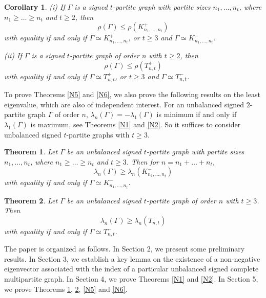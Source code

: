 \documentclass[10pt,a4paper]{amsart}
\numberwithin{equation}{section}
\newtheorem {Theorem} {Theorem}[section]
\newtheorem {Corollary}{Corollary}[section]
\begin{document}
\begin{Corollary}\label{N51}
(i) If  $\Gamma$ is a signed $t$-partite graph with partite sizes $n_1, \dots, n_t$, where $n_1\ge \dots\ge n_t$ and $t\ge 2$, then
\[
\rho(\Gamma)\le \rho (K_{n_1, \dots, n_t}^+)
\]
with equality if and only if $\Gamma\simeq K_{n_1, \dots, n_t}^+$, or $t\ge 3$ and $\Gamma\simeq K_{n_1, \dots, n_t}^-$.

(ii) If $\Gamma$ is a signed $t$-partite graph of order $n$ with $t\ge 2$, then
\[
\rho(\Gamma)\le \rho(T_{n,t}^+)
\]
with equality if and only if $\Gamma\simeq T_{n,t}^+$, or $t\ge 3$ and $\Gamma\simeq
T_{n, t}^-$.
\end{Corollary}








To prove Theorems \ref{N5} and \ref{N6}, we also prove the following results on the least eigenvalue, which are also of independent  interest. 
For an unbalanced signed $2$-partite graph $\Gamma$ of order $n$,  $\lambda_n(\Gamma)=-\lambda_1(\Gamma)$ is minimum if and only if $\lambda_1(\Gamma)$ is maximum, see Theorems \ref{N1} and \ref{N2}. So it suffices to consider unbalanced signed $t$-partite graphs with $t\ge 3$.

 

\begin{Theorem}\label{N3}
Let $\Gamma$ be an unbalanced signed $t$-partite graph with partite sizes $n_1, \dots, n_t$, where $n_1\ge \dots\ge n_t$ and $t\ge 3$. Then for $n=n_1+\dots+n_t$, 
	\[
	\lambda_n(\Gamma)\ge \lambda_n (K_{n_1, \dots, n_t}^-)
	\]
	with equality if and only if $\Gamma\simeq K_{n_1, \dots, n_t}^-$.
\end{Theorem}

\begin{Theorem}\label{N4}
Let $\Gamma$ be an unbalanced signed $t$-partite graph of order $n$ with $t\ge 3$. Then
\[
\lambda_n(\Gamma)\ge \lambda_n (T_{n, t}^-)
\]
with equality if and only if $\Gamma\simeq T_{n, t}^-$.
\end{Theorem}


The paper is organized as follows. In Section 2, we present some preliminary results. In Section 3, we establish a key  lemma on the existence of a non-negative eigenvector associated with the index of a particular unbalanced signed complete multipartite graph. In Section 4, we prove Theorems \ref{N1} and \ref{N2}. In Section 5, we prove Theorems \ref{N3}, \ref{N4}, \ref{N5} and \ref{N6}.
\end{document}
